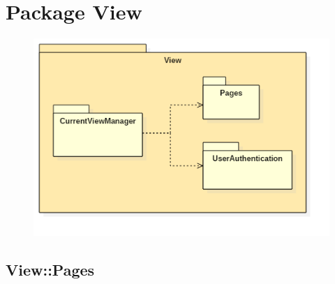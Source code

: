 \section{Package View}
\begin{figure}[h!]
\begin{center}
	\includegraphics[scale=0.7]{../images/ViewPackage.png}
\end{center}
\end{figure}

\subsection{View::Pages}

